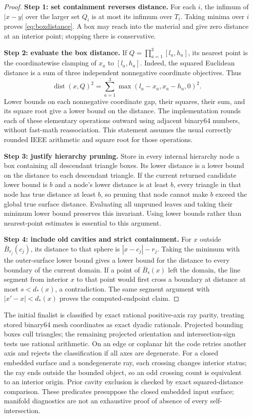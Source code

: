 \begin{proof}
\textbf{Step 1: set containment reverses distance.}
For each $i$, the infimum of $|x-y|$ over the larger set $Q_i$ is at most
its infimum over $T_i$. Taking minima over $i$ proves
\cref{eq:boxdistance}. A box may reach into the material and give zero
distance at an interior point; stopping there is conservative.

\textbf{Step 2: evaluate the box distance.}
If $Q=\prod_{a=1}^3[l_a,h_a]$, its nearest point is the coordinatewise
clamping of $x_a$ to $[l_a,h_a]$. Indeed, the squared Euclidean distance is
a sum of three independent nonnegative coordinate objectives. Thus
\[
 \operatorname{dist}(x,Q)^2
 =\sum_{a=1}^3\max(l_a-x_a,x_a-h_a,0)^2.
\]
Lower bounds on each nonnegative coordinate gap, their squares, their sum,
and its square root give a lower bound on the distance. The implementation
rounds each of these elementary operations outward using adjacent binary64
numbers, without fast-math reassociation. This statement assumes the usual
correctly rounded IEEE arithmetic and square root for those operations.

\textbf{Step 3: justify hierarchy pruning.}
Store in every internal hierarchy node a box containing all descendant
triangle boxes. Its lower distance is a lower bound on the distance to each
descendant triangle. If the current returned candidate lower bound is $b$
and a node's lower distance is at least $b$, every triangle in that node
has true distance at least $b$, so pruning that node cannot make $b$ exceed
the global true surface distance. Evaluating all unpruned leaves and taking
their minimum lower bound preserves this invariant. Using lower bounds
rather than nearest-point estimates is essential to this argument.

\textbf{Step 4: include old cavities and strict containment.}
For $x$ outside $\overline B_{r_j}(c_j)$, its distance to that sphere is
$|x-c_j|-r_j$. Taking the minimum with the outer-surface lower bound gives
a lower bound for the distance to every boundary of the current domain.
If a point of $\overline B_s(x)$ left the domain, the line segment from
interior $x$ to that point would first cross a boundary at distance at most
$s<d_*(x)$, a contradiction. The same segment argument with
$|x'-x|<d_*(x)$ proves the computed-endpoint claim.
\end{proof}

The initial finalist is classified by exact rational positive-axis ray
parity, treating stored binary64 mesh coordinates as exact dyadic rationals.
Projected bounding boxes cull triangles; the remaining projected orientation
and intersection-sign tests use rational arithmetic. On an edge or coplanar
hit the code retries another axis and rejects the classification if all axes
are degenerate. For a closed embedded surface and a nondegenerate ray, each
crossing changes interior status; the ray ends outside the bounded object,
so an odd crossing count is equivalent to an interior origin. Prior cavity
exclusion is checked by exact squared-distance comparison. These predicates
presuppose the closed embedded input surface; manifold diagnostics are not
an exhaustive proof of absence of every self-intersection.

